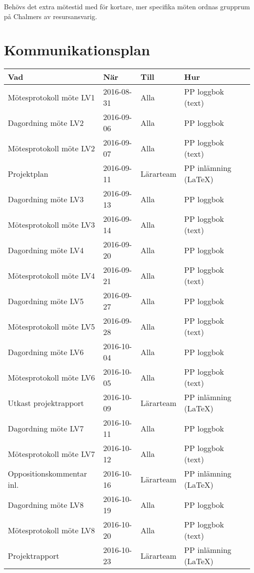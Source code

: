 \documentclass[a4paper]{article}
\begin{document}
\vspace{5mm}
\noindent Behövs det extra mötestid med för kortare, mer specifika möten ordnas grupprum på Chalmers av resursansvarig.



\section{Kommunikationsplan}

\begin{tabular}{|l|l|l|l|} \hline
\bf Vad                  & \bf När    & \bf Till  & \bf Hur               \\ \hline \hline
Mötesprotokoll möte LV1  & 2016-08-31 & Alla      & PP loggbok   (text)  \\ \hline
Dagordning möte LV2      & 2016-09-06 & Alla      & PP loggbok           \\ \hline
Mötesprotokoll möte LV2  & 2016-09-07 & Alla      & PP loggbok   (text)  \\ \hline
Projektplan              & 2016-09-11 & Lärarteam & PP inlämning (LaTeX) \\ \hline
Dagordning möte LV3      & 2016-09-13 & Alla      & PP loggbok           \\ \hline
Mötesprotokoll möte LV3  & 2016-09-14 & Alla      & PP loggbok   (text)  \\ \hline
Dagordning möte LV4      & 2016-09-20 & Alla      & PP loggbok           \\ \hline
Mötesprotokoll möte LV4  & 2016-09-21 & Alla      & PP loggbok   (text)  \\ \hline
Dagordning möte LV5      & 2016-09-27 & Alla      & PP loggbok           \\ \hline
Mötesprotokoll möte LV5  & 2016-09-28 & Alla      & PP loggbok   (text)  \\ \hline
Dagordning möte LV6      & 2016-10-04 & Alla      & PP loggbok           \\ \hline
Mötesprotokoll möte LV6  & 2016-10-05 & Alla      & PP loggbok   (text)  \\ \hline
Utkast projektrapport    & 2016-10-09 & Lärarteam & PP inlämning (LaTeX) \\ \hline
Dagordning möte LV7      & 2016-10-11 & Alla      & PP loggbok           \\ \hline
Mötesprotokoll möte LV7  & 2016-10-12 & Alla      & PP loggbok   (text)  \\ \hline
Oppositionskommentar inl.& 2016-10-16 & Lärarteam & PP inlämning (LaTeX) \\ \hline
Dagordning möte LV8      & 2016-10-19 & Alla      & PP loggbok           \\ \hline
Mötesprotokoll möte LV8  & 2016-10-20 & Alla      & PP loggbok   (text)  \\ \hline
Projektrapport           & 2016-10-23 & Lärarteam & PP inlämning (LaTeX) \\ \hline

\end{tabular}
\end{document}
